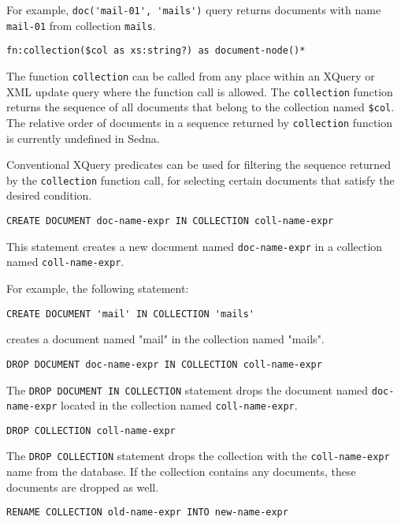 \documentclass[a4paper,12pt]{article}
\begin{document}
For example, \verb!doc('mail-01', 'mails')! query returns documents with name
\verb!mail-01! from collection \verb!mails!.

\begin{verbatim}
fn:collection($col as xs:string?) as document-node()*
\end{verbatim}
The function \verb!collection! can be called from any place within an XQuery or
XML update query where the function call is allowed. The \verb!collection!
function returns the sequence of all documents that belong to the collection
named \verb!$col!. The relative order of documents in a sequence returned by
\verb!collection! function is currently undefined in Sedna.

Conventional XQuery predicates can be used for filtering the sequence returned
by the \verb!collection! function call, for selecting certain documents that
satisfy the desired condition.

\begin{verbatim}
CREATE DOCUMENT doc-name-expr IN COLLECTION coll-name-expr
\end{verbatim}

This statement creates a new document named \verb!doc-name-expr! in a collection
named \verb!coll-name-expr!.

For example, the following statement:
\begin{verbatim}
CREATE DOCUMENT 'mail' IN COLLECTION 'mails'
\end{verbatim}
creates a document named "mail" in the collection named "mails".

\begin{verbatim}
DROP DOCUMENT doc-name-expr IN COLLECTION coll-name-expr
\end{verbatim}

The \verb!DROP DOCUMENT IN COLLECTION! statement drops the document named
\verb!doc-name-expr! located in the collection named \verb!coll-name-expr!.

\begin{verbatim}
DROP COLLECTION coll-name-expr
\end{verbatim}

The \verb!DROP COLLECTION! statement drops the collection with the
\verb!coll-name-expr! name from the database. If the collection contains any
documents, these documents are dropped as well.

\begin{verbatim}
RENAME COLLECTION old-name-expr INTO new-name-expr
\end{verbatim}
\end{document}
